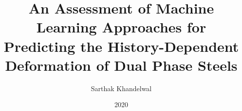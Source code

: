 \title{An Assessment of Machine Learning Approaches for
Predicting the History-Dependent Deformation of Dual Phase Steels
}
\author{Sarthak Khandelwal}
\date{2020}



\reporttype{}



\maketitle
